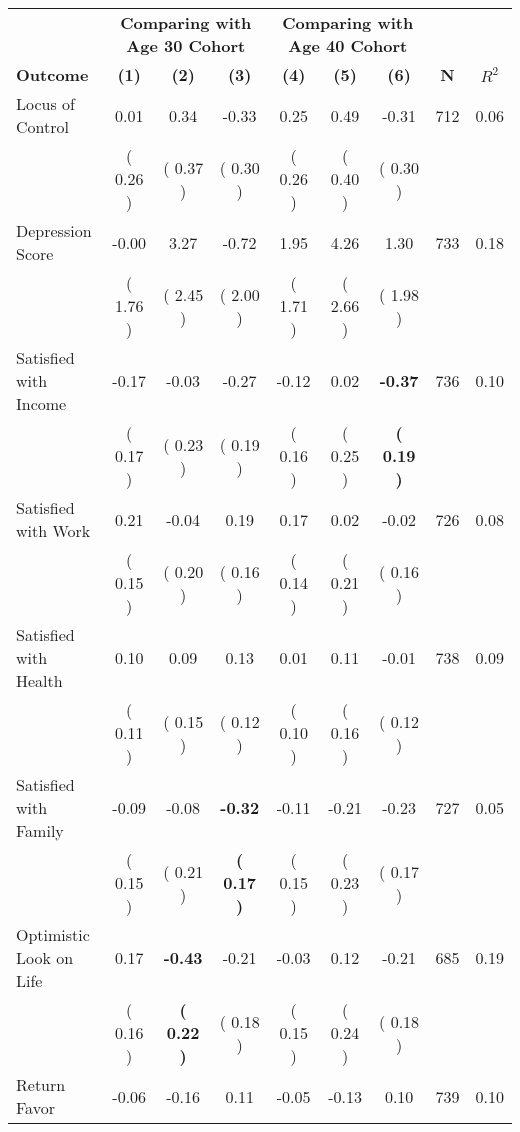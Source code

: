 \begin{tabular}{lcccccccc}
\toprule
 & \multicolumn{3}{c}{\textbf{Comparing with Age 30 Cohort}} & \multicolumn{3}{c}{\textbf{Comparing with Age 40 Cohort}} & \\
\cmidrule(lr){2-4} \cmidrule(lr){5-7} 
 \textbf{Outcome} & \textbf{(1)} & \textbf{(2)} & \textbf{(3)} & \textbf{(4)} & \textbf{(5)} & \textbf{(6)} & \textbf{N} & \textbf{$ R^2$} \\
\midrule
Locus of Control &      0.01 &      0.34 &     -0.33 &      0.25 &      0.49 &     -0.31 & 712 &       0.06 \\ 
 & (     0.26 ) & (     0.37 ) & (     0.30 ) & (     0.26 ) & (     0.40 ) & (     0.30 ) & \\
Depression Score &     -0.00 &      3.27 &     -0.72 &      1.95 &      4.26 &      1.30 & 733 &       0.18 \\ 
 & (     1.76 ) & (     2.45 ) & (     2.00 ) & (     1.71 ) & (     2.66 ) & (     1.98 ) & \\
Satisfied with Income &     -0.17 &     -0.03 &     -0.27 &     -0.12 &      0.02 & \textbf{    -0.37} & 736 &       0.10 \\ 
 & (     0.17 ) & (     0.23 ) & (     0.19 ) & (     0.16 ) & (     0.25 ) & \textbf{(     0.19 )} & \\
Satisfied with Work &      0.21 &     -0.04 &      0.19 &      0.17 &      0.02 &     -0.02 & 726 &       0.08 \\ 
 & (     0.15 ) & (     0.20 ) & (     0.16 ) & (     0.14 ) & (     0.21 ) & (     0.16 ) & \\
Satisfied with Health &      0.10 &      0.09 &      0.13 &      0.01 &      0.11 &     -0.01 & 738 &       0.09 \\ 
 & (     0.11 ) & (     0.15 ) & (     0.12 ) & (     0.10 ) & (     0.16 ) & (     0.12 ) & \\
Satisfied with Family &     -0.09 &     -0.08 & \textbf{    -0.32} &     -0.11 &     -0.21 &     -0.23 & 727 &       0.05 \\ 
 & (     0.15 ) & (     0.21 ) & \textbf{(     0.17 )} & (     0.15 ) & (     0.23 ) & (     0.17 ) & \\
Optimistic Look on Life &      0.17 & \textbf{    -0.43} &     -0.21 &     -0.03 &      0.12 &     -0.21 & 685 &       0.19 \\ 
 & (     0.16 ) & \textbf{(     0.22 )} & (     0.18 ) & (     0.15 ) & (     0.24 ) & (     0.18 ) & \\
Return Favor &     -0.06 &     -0.16 &      0.11 &     -0.05 &     -0.13 &      0.10 & 739 &       0.10 \\ 

\end{tabular}
